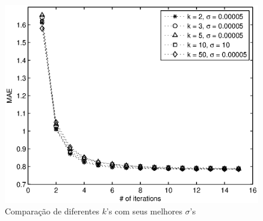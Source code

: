 \begin{figure}[ht]
\centering
\includegraphics{final.eps}
\caption{Comparação de diferentes $k$'s com seus melhores $\sigma$'s}
\label{fig:final}
\end{figure}












